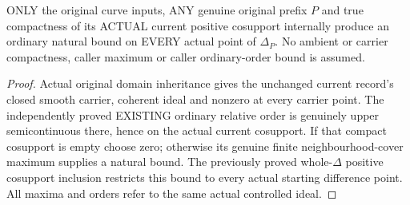 \begin{theorem}
\label{hir:sharp-original-curve-compact-current-ordinary-order-bound}
\leanok
ONLY the original curve inputs, ANY genuine original prefix $P$ and true
compactness of its ACTUAL current positive cosupport internally produce
an ordinary natural bound on EVERY actual point of $\Delta_P$. No ambient
or carrier compactness, caller maximum or caller ordinary-order bound
is assumed.
\end{theorem}
\begin{proof}
Actual original domain inheritance gives the unchanged current record's
closed smooth carrier, coherent ideal and nonzero at every carrier point.
The independently proved EXISTING ordinary relative order is genuinely
upper semicontinuous there, hence on the actual current cosupport. If
that compact cosupport is empty choose zero; otherwise its genuine finite
neighbourhood-cover maximum supplies a natural bound. The previously
proved whole-$\Delta$ positive cosupport inclusion restricts this bound
to every actual starting difference point. All maxima and orders refer
to the same actual controlled ideal.
\end{proof}

